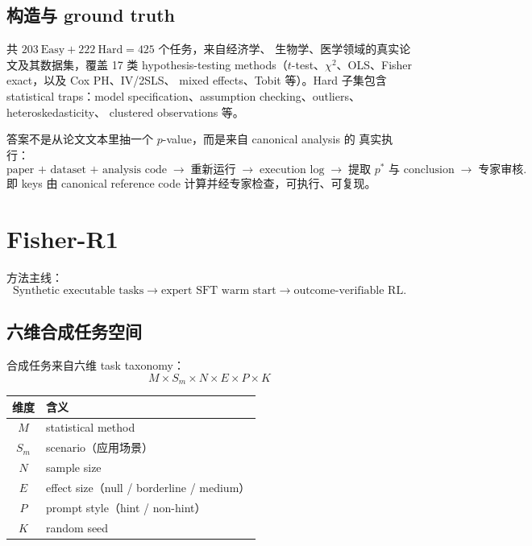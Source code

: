 \documentclass[12pt]{ctexart}
\begin{document}
\subsection{构造与 ground truth}

共 $203\ \text{Easy} + 222\ \text{Hard} = 425$ 个任务，来自经济学、
生物学、医学领域的真实论文及其数据集，覆盖 17 类 hypothesis-testing
methods（$t$-test、$\chi^2$、OLS、Fisher exact，以及 Cox PH、IV/2SLS、
mixed effects、Tobit 等）。Hard 子集包含 statistical traps：model
specification、assumption checking、outliers、heteroskedasticity、
clustered observations 等。

答案不是从论文文本里抽一个 $p$-value，而是来自 canonical analysis 的
真实执行：
\[
  \text{paper + dataset + analysis code}
  \;\rightarrow\; \text{重新运行}
  \;\rightarrow\; \text{execution log}
  \;\rightarrow\; \text{提取 } p^{*}\text{ 与 conclusion}
  \;\rightarrow\; \text{专家审核}.
\]
即 keys 由 canonical reference code 计算并经专家检查，可执行、可复现。

\section{Fisher-R1}

方法主线：
\[
  \text{Synthetic executable tasks}
  \rightarrow \text{expert SFT warm start}
  \rightarrow \text{outcome-verifiable RL}.
\]

\subsection{六维合成任务空间}

合成任务来自六维 task taxonomy：
\[
  M \times S_m \times N \times E \times P \times K
\]

\begin{center}
\begin{tabular}{c l}
  \toprule
  维度 & 含义 \\
  \midrule
  $M$   & statistical method \\
  $S_m$ & scenario（应用场景） \\
  $N$   & sample size \\
  $E$   & effect size（null / borderline / medium） \\
  $P$   & prompt style（hint / non-hint） \\
  $K$   & random seed \\
  \bottomrule
\end{tabular}
\end{center}
\end{document}
